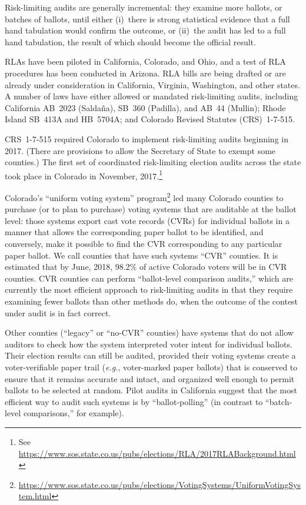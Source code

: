 \documentclass[12pt]{article}
\begin{document}
Risk-limiting audits are generally incremental: they examine more ballots, or batches of ballots,
until either (i)~there is strong statistical evidence that a full hand tabulation would confirm the outcome,
or (ii)~the audit has led to a full hand tabulation, the result of which should become the official
result.

RLAs have been piloted in California, Colorado, and Ohio, and a test of
RLA procedures has been conducted in Arizona.
RLA bills are being drafted or are already under consideration in California,
Virginia, Washington, and other states.
A number of laws have either allowed or mandated risk-limiting audits,
including California AB~2023 (Salda\~{n}a), SB~360 (Padilla), and AB~44 (Mullin);
Rhode Island SB~413A and HB~5704A; and Colorado Revised Statutes (CRS)~1-7-515.

CRS~1-7-515 required 
Colorado to implement risk-limiting audits beginning in 2017.
(There are provisions to allow the Secretary of State to exempt some counties.)
The first set of coordinated risk-limiting election audits across the state took place in Colorado in November, 2017.\footnote{%
 See \url{https://www.sos.state.co.us/pubs/elections/RLA/2017RLABackground.html}
}
 

Colorado's ``uniform voting system'' program\footnote{%
\url{https://www.sos.state.co.us/pubs/elections/VotingSystems/UniformVotingSystem.html}
} led
many Colorado counties to purchase (or to plan to purchase) voting systems
that are auditable at the ballot level: those systems export cast vote records (CVRs)
for individual ballots in a manner that allows the corresponding paper ballot to be identified,
and conversely, make it possible to find the CVR corresponding to any
particular paper ballot.
We call counties that have such systems ``CVR'' counties.
It is estimated that by June, 2018, 98.2\% of active Colorado voters will be in CVR counties.
CVR counties can perform ``ballot-level comparison audits,'' \citep{lindemanStark12} 
which are currently the
most efficient approach to risk-limiting audits in that they require examining
fewer ballots than other methods do, when the outcome of the contest under audit 
is in fact correct.

Other counties (``legacy'' or ``no-CVR'' counties) 
have systems that do not allow auditors to check how the system
interpreted voter intent for individual ballots.
Their election results can still be audited, provided their voting systems
create a voter-verifiable paper trail (\emph{e.g.}, voter-marked paper ballots) that is
conserved to ensure that it remains accurate and intact, and organized well enough
to permit ballots to be selected at random.
Pilot audits in California suggest that the most efficient way to audit such systems
is by ``ballot-polling'' \citep{lindemanEtal12,lindemanStark12} 
(in contrast to ``batch-level comparisons,'' for example).
\end{document}
